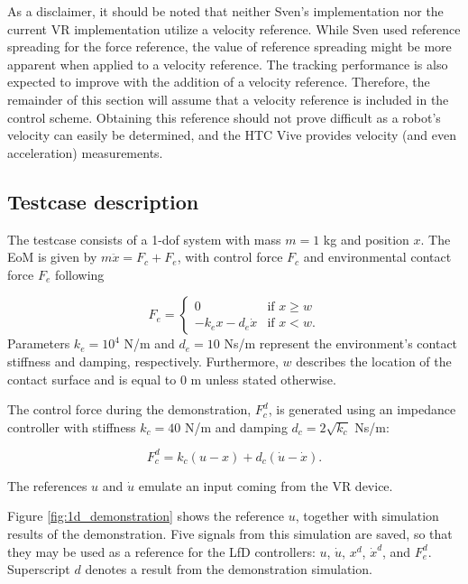 \documentclass[11pt]{report}
\numberwithin{equation}{section}        %
\numberwithin{figure}{section}          %
\numberwithin{table}{section}           %
\begin{document}
  As a disclaimer, it should be noted that neither Sven's implementation nor the current VR implementation utilize a velocity reference. While Sven used reference spreading for the force reference, the value of reference spreading might be more apparent when applied to a velocity reference. The tracking performance is also expected to improve with the addition of a velocity reference. Therefore, the remainder of this section will assume that a velocity reference is included in the control scheme. Obtaining this reference should not prove difficult as a robot's velocity can easily be determined, and the HTC Vive provides velocity (and even acceleration) measurements.

  \subsection{Testcase description}
  The testcase consists of a 1-dof system with mass $m=1$ kg and position $x$. The EoM is given by $m\ddot{x}=F_c+F_e$, with control force $F_c$ and environmental contact force $F_e$ following

  $$F_e=\begin{cases}
    0 & \text{if } x\geq w\\
    -k_e x-d_e \dot{x}               & \text{if } x<w.
  \end{cases}$$
  Parameters $k_e=10^4$ N/m and $d_e=10$ Ns/m represent the environment's contact stiffness and damping, respectively. Furthermore, $w$ describes the location of the contact surface and is equal to $0$ m unless stated otherwise.

  The control force during the demonstration, $F_c^d$, is generated using an impedance controller with stiffness $k_c=40$ N/m and damping $d_c=2\sqrt{k_c}$ Ns/m:

  $$ F_c^d = k_c(u-x)+d_c(\dot{u}-\dot{x}).$$

  The references $u$ and $\dot{u}$ emulate an input coming from the VR device.

  Figure \ref{fig:1d_demonstration} shows the reference $u$, together with simulation results of the demonstration. Five signals from this simulation are saved, so that they may be used as a reference for the LfD controllers: $u$, $\dot{u}$, $x^d$, $\dot{x}^d$, and $F_e^d$. Superscript $d$ denotes a result from the demonstration simulation.
\end{document}
